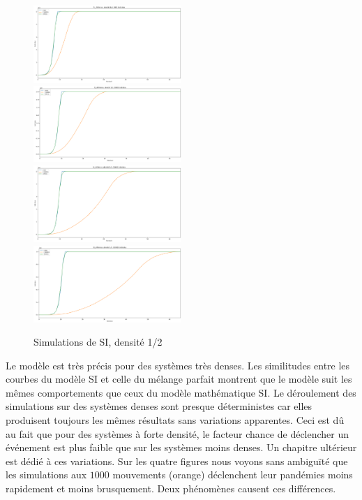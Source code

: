 \begin{figure}
    \centering
    \captionsetup{justification=centering}
    \includegraphics[width=0.5\textwidth]{Images/SI_ref_2_5k.png}
    \includegraphics[width=0.5\textwidth]{Images/SI_ref_2_20k.png}
    \includegraphics[width=0.5\textwidth]{Images/SI_ref_2_50k.png}
    \includegraphics[width=0.5\textwidth]{Images/SI_ref_2_100k.png}
    \caption{Simulations de SI, densité 1/2}
\end{figure}

Le modèle est très précis pour des systèmes très denses. Les similitudes entre les courbes du modèle SI et celle du mélange parfait montrent que le modèle suit les mêmes comportements que ceux du modèle mathématique SI. Le déroulement des simulations sur des systèmes denses sont presque déterministes car elles produisent toujours les mêmes résultats sans variations apparentes. Ceci est dû au fait que pour des systèmes à forte densité, le facteur chance de déclencher un événement est plus faible que sur les systèmes moins denses. Un chapitre ultérieur est dédié à ces variations. Sur les quatre figures nous voyons sans ambiguïté que les simulations aux $1000$ mouvements (orange) déclenchent leur pandémies moins rapidement et moins brusquement. Deux phénomènes causent ces différences. \\

